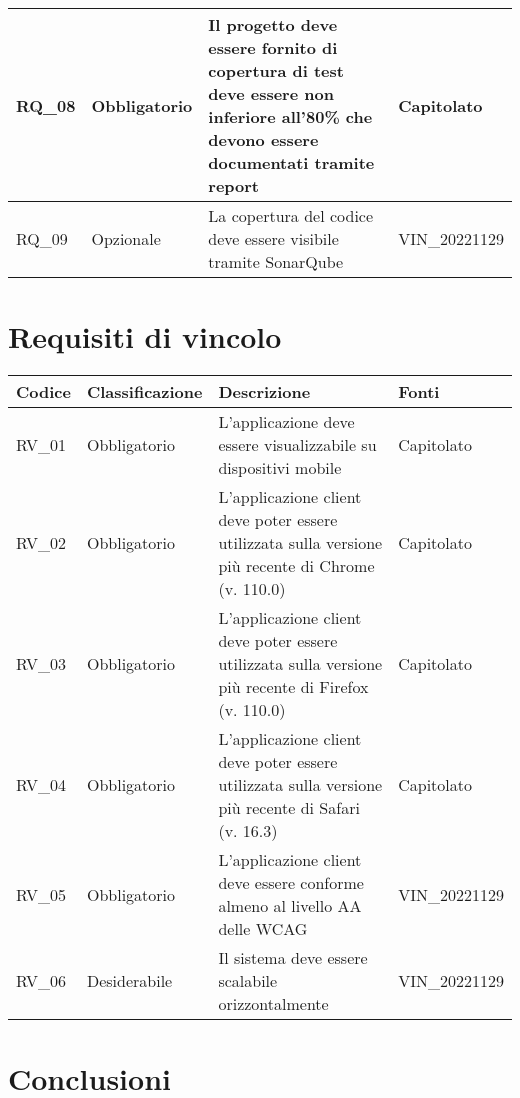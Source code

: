 \begin{center}
\begin{xltabular}{\linewidth}{|l|l|X|l|}
    \hline
    RQ\_08 & Obbligatorio & Il progetto deve essere fornito di copertura di test deve essere non inferiore all'80\% che devono essere documentati tramite report & Capitolato \\

    \hline
    RQ\_09 & Opzionale & La copertura del codice deve essere visibile tramite SonarQube & VIN\_20221129 \\

    \hline

    \end{xltabular}

\end{center}

\section{Requisiti di vincolo}

\begin{center}
    \begin{xltabular}{\linewidth}{|l|l|X|l|}
    \hline
    \textbf{Codice} & \textbf{Classificazione} & \textbf{Descrizione} & \textbf{Fonti} \\
    \hline
    RV\_01 & Obbligatorio & L'applicazione deve essere visualizzabile su dispositivi mobile & Capitolato \\

    \hline
    RV\_02 & Obbligatorio & L'applicazione client deve poter essere utilizzata sulla versione più recente di Chrome (v. 110.0) & Capitolato \\

    \hline
    RV\_03 & Obbligatorio & L'applicazione client deve poter essere utilizzata sulla versione più recente di Firefox (v. 110.0) & Capitolato \\

    \hline
    RV\_04 & Obbligatorio & L'applicazione client deve poter essere utilizzata sulla versione più recente di Safari (v. 16.3) & Capitolato \\

    \hline
    RV\_05 & Obbligatorio & L'applicazione client deve essere conforme almeno al livello AA delle WCAG  & VIN\_20221129 \\

    \hline
    RV\_06 & Desiderabile & Il sistema deve essere scalabile orizzontalmente  & VIN\_20221129 \\

    \hline

    \end{xltabular}
    \end{center}

\section{Conclusioni}